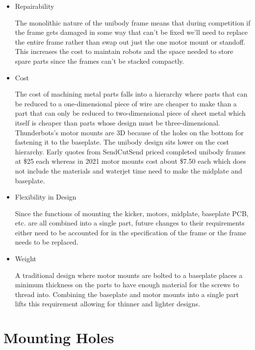 \documentclass{iopart}
\begin{document}
\begin{itemize}
    \item Repairability
    \medskip

    The monolithic nature of the unibody frame means that during competition if the frame gets damaged in some way that can't be fixed we'll need to replace the entire frame rather than swap out just the one motor mount or standoff. This increases the cost to maintain robots and the space needed to store spare parts since the frames can't be stacked compactly.

    \medskip
    \item Cost

    The cost of machining metal parts falls into a hierarchy where parts that can be reduced to a one-dimensional piece of wire are cheaper to make than a part that can only be reduced to two-dimensional piece of sheet metal which itself is cheaper than parts whose design must be three-dimensional. Thunderbots's motor mounts are 3D because of the holes on the bottom for fastening it to the baseplate. The unibody design sits lower on the cost hierarchy. Early quotes from SendCutSend priced completed unibody frames at \$25 each whereas in 2021 motor mounts cost about \$7.50 each which does not include the materials and waterjet time need to make the midplate and baseplate.

    \medskip
    \item Flexibility in Design

    Since the functions of mounting the kicker, motors, midplate, baseplate PCB, etc. are all combined into a single part, future changes to their requirements either need to be accounted for in the specification of the frame or the frame needs to be replaced.

    \medskip
    \item Weight
    
    A traditional design where motor mounts are bolted to a baseplate places a minimum thickness on the parts to have enough material for the screws to thread into. Combining the baseplate and motor mounts into a single part lifts this requirement allowing for thinner and lighter designs.
\end{itemize}

\section{Mounting Holes}
\end{document}
